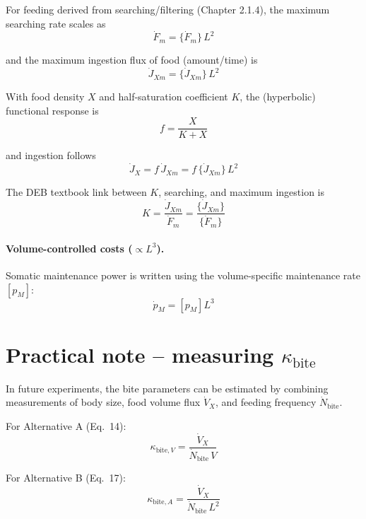 \documentclass[11pt]{article}
\begin{document}
For feeding derived from searching/filtering (Chapter 2.1.4), the maximum searching rate scales as
\begin{equation}
  \dot F_m = \{\dot F_m\}\,L^2
\end{equation}

and the maximum ingestion flux of food (amount/time) is
\begin{equation}
  \dot J_{X m} = \{\dot J_{X m}\}\,L^2
\end{equation}

With food density $X$ and half-saturation coefficient $K$, the (hyperbolic) functional response is
\begin{equation}
  f = \frac{X}{K+X}
\end{equation}

and ingestion follows
\begin{equation}
  \dot J_X = f\,\dot J_{X m} = f\,\{\dot J_{X m}\}\,L^2
\end{equation}

The DEB textbook link between $K$, searching, and maximum ingestion is
\begin{equation}
  K = \frac{\dot J_{X m}}{\dot F_m} = \frac{\{\dot J_{X m}\}}{\{\dot F_m\}}
\end{equation}

\paragraph{Volume-controlled costs ($\propto L^3$).}

Somatic maintenance power is written using the volume-specific maintenance rate $[p_M]$:
\begin{equation}
  \dot p_M = [p_M] L^3
\end{equation}

\section{Practical note -- measuring $\kappa_{\text{bite}}$}

In future experiments, the bite parameters can be estimated by combining measurements of body size, food volume flux $\dot V_X$, and feeding frequency $\dot N_{\text{bite}}$.

For Alternative A (Eq.~14):
\begin{equation}
  \kappa_{\text{bite},V} = \frac{\dot V_X}{\dot N_{\text{bite}}\,V}
\end{equation}

For Alternative B (Eq.~17):
\begin{equation}
  \kappa_{\text{bite},A} = \frac{\dot V_X}{\dot N_{\text{bite}}\,L^2}
\end{equation}
\end{document}
